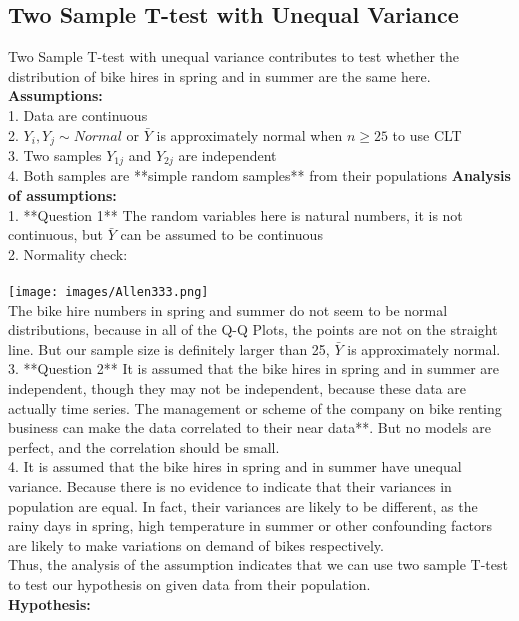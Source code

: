 \subsection{Two Sample T-test with Unequal Variance}
Two Sample T-test with unequal variance contributes to test whether the distribution of bike hires in spring and in summer are the same here. \\
\textbf{Assumptions:} ~\\
1. Data are continuous\\ 
2. $Y_i, Y_j \sim Normal$ or $\bar{Y}$ is approximately normal when $n\ge 25$ to use CLT \\ 
3. Two samples  $Y_{1j}$ and $Y_{2j}$  are independent\\ 
4. Both samples are **simple random samples** from their populations
\textbf{Analysis of assumptions:} ~\\ 
1. **Question 1** The random variables here is natural numbers, it is not continuous, but $\bar{Y}$ can be assumed to be continuous\\
2. Normality check:\\ \\
\texttt{[image: images/Allen333.png]}\\
The bike hire numbers in spring and summer do not seem to be normal distributions, because in all of the Q-Q Plots, the points are not on the straight line. But our sample size is definitely larger than 25, $\bar{Y}$ is approximately normal.\\
3. **Question 2** It is assumed that the bike hires in spring and in summer are independent, though they may not be independent, because these data are actually time series. The management or scheme of the company on bike renting business can make the data correlated to their near data**. But no models are perfect, and the correlation should be small. \\
4. It is assumed that the bike hires in spring and in summer have unequal variance. Because there is no evidence to indicate that their variances in population are equal. In fact, their variances are likely to be different, as the rainy days in spring, high temperature in summer or other confounding factors are likely to make variations on demand of bikes respectively.\\
Thus, the analysis of the assumption indicates that we can use two sample T-test to test our hypothesis on given data from their population.\\
\textbf{Hypothesis:} ~\\
